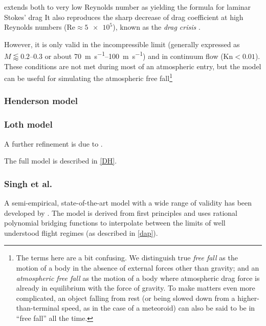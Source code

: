             extends both to very low Reynolds number as
            yielding the formula for laminar Stokes' drag
            It also reproduces the sharp decrease of drag coefficient at high Reynolds
            numbers ($\mathrm{Re} \approx \num{5e5}$), known as the \emph{drag crisis} \cite{???}.


            However, it is only valid in the incompressible limit (generally expressed as $M \lessapprox \numrange{0.2}{0.3}$ or
            about \SIrange{70}{100}{\metre\per\second}) and in continuum flow ($\mathrm{Kn} < \num{0.01}$).
            These conditions are not met during most of an atmospheric entry,
            but the model can be useful for simulating the atmospheric free
            fall\footnote{The terms here are a bit confusing. We distinguish true \emph{free fall} as
            the motion of a body in the absence of external forces other than gravity; and an \emph{atmospheric free fall}
            as the motion of a body where atmospheric drag force is already in equilibrium
            with the force of gravity. To make matters even more complicated, an object falling from rest
            (or being slowed down from a higher-than-terminal speed, as in the case of a meteoroid)
            can also be said to be in ``free fall'' all the time.}

        \subsubsection{Henderson model} \label{ddH}

        \subsubsection{Loth model} \label{ddL}
            A further refinement is due to \cite{loth???}.

            The full model is described in \cref{DH}.

        \subsubsection{Singh et al.} \label{ddS}
            A semi-empirical, state-of-the-art model with a wide range of validity has been developed by
            \citet{singh+2020}. The model is derived from first principles and
            uses rational polynomial bridging functions to interpolate between
            the limits of well understood flight regimes (as described in \cref{dap}).

